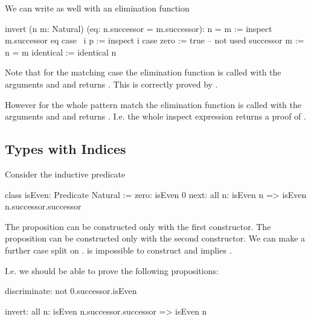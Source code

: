We can write  as well with an elimination function

\begin{alba}
    invert (n m: Natural) (eq: n.successor = m.successor): n = m :=
        inspect
            m.successor
            eq
        case
            {\ i p :=
                inspect i case
                    zero :=
                        true -- not used
                    successor m :=
                        n = m}
            identical :=
                identical n
\end{alba}

Note that for the matching case the elimination function is called with the
arguments  and  and returns .  This is
correctly proved by .

However for the whole pattern match the elimination function is called with the
arguments  and  and returns . I.e. the
whole inspect expression returns a proof of .







\subsection{Types with Indices}

Consider the inductive predicate

\begin{alba}
    class
        isEven: Predicate Natural
    :=
        zero: isEven 0
        next: all n: isEven n => isEven n.successor.successor
\end{alba}

The proposition  can be constructed only with the first
constructor. The proposition  can be
constructed only with the second constructor. We can make a further case split
on .   is impossible to construct and
 implies .

I.e. we should be able to prove the following propositions:

\begin{alba}
    discriminate: not 0.successor.isEven

    invert: all n: isEven n.successor.successor => isEven n
\end{alba}



